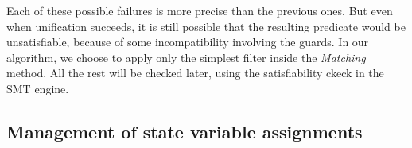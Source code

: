 \documentclass{lncs/llncs}
\begin{document}
Each of these possible failures is more precise than the previous
ones. But even when unification succeeds, it is still possible that
the resulting predicate would be unsatisfiable, because of some
incompatibility involving the guards. In our algorithm, we choose to
apply only the simplest filter inside the \emph{Matching} method. All
the rest will be checked later, using the satisfiability ckeck in the
SMT engine.


\subsection{Management of state variable assignments}
%
\end{document}
